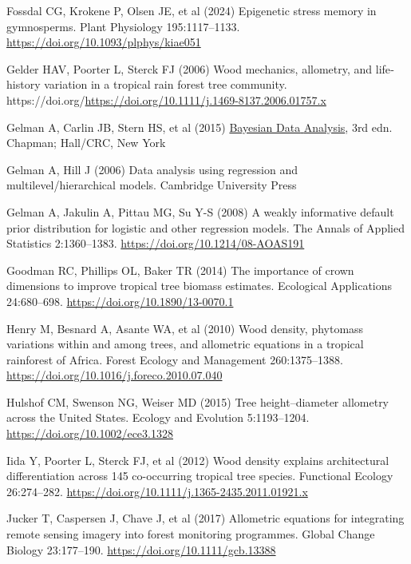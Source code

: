 \documentclass[
  12pt,
  letterpaper,
  DIV=11,
  numbers=noendperiod]{scrartcl}
\newlength{\cslhangindent}
\newenvironment{CSLReferences}[2] %
 {\begin{list}{}{%
  \setlength{\itemindent}{0pt}
  \setlength{\leftmargin}{0pt}
  \setlength{\parsep}{0pt}
  \ifodd #1
   \setlength{\leftmargin}{\cslhangindent}
   \setlength{\itemindent}{-1\cslhangindent}
  \fi
  \setlength{\itemsep}{#2\baselineskip}}}
 {\end{list}}
\begin{document}
\begin{CSLReferences}{1}{1}
Fossdal CG, Krokene P, Olsen JE, et al (2024) Epigenetic stress memory
in gymnosperms. Plant Physiology 195:1117--1133.
\url{https://doi.org/10.1093/plphys/kiae051}

Gelder HAV, Poorter L, Sterck FJ (2006) Wood mechanics, allometry, and
life‐history variation in a tropical rain forest tree community.
https://doi.org/\url{https://doi.org/10.1111/j.1469-8137.2006.01757.x}

Gelman A, Carlin JB, Stern HS, et al (2015)
\href{https://doi.org/10.1201/b16018}{Bayesian {Data} {Analysis}}, 3rd
edn. Chapman; Hall/CRC, New York

Gelman A, Hill J (2006) Data analysis using regression and
multilevel/hierarchical models. Cambridge University Press

Gelman A, Jakulin A, Pittau MG, Su Y-S (2008) A weakly informative
default prior distribution for logistic and other regression models. The
Annals of Applied Statistics 2:1360--1383.
\url{https://doi.org/10.1214/08-AOAS191}

Goodman RC, Phillips OL, Baker TR (2014) The importance of crown
dimensions to improve tropical tree biomass estimates. Ecological
Applications 24:680--698. \url{https://doi.org/10.1890/13-0070.1}

Henry M, Besnard A, Asante WA, et al (2010) Wood density, phytomass
variations within and among trees, and allometric equations in a
tropical rainforest of {Africa}. Forest Ecology and Management
260:1375--1388. \url{https://doi.org/10.1016/j.foreco.2010.07.040}

Hulshof CM, Swenson NG, Weiser MD (2015) Tree height--diameter allometry
across the {United} {States}. Ecology and Evolution 5:1193--1204.
\url{https://doi.org/10.1002/ece3.1328}

Iida Y, Poorter L, Sterck FJ, et al (2012) Wood density explains
architectural differentiation across 145 co-occurring tropical tree
species. Functional Ecology 26:274--282.
\url{https://doi.org/10.1111/j.1365-2435.2011.01921.x}

Jucker T, Caspersen J, Chave J, et al (2017) Allometric equations for
integrating remote sensing imagery into forest monitoring programmes.
Global Change Biology 23:177--190.
\url{https://doi.org/10.1111/gcb.13388}


\end{CSLReferences}
\end{document}
